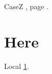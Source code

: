 \documentclass{article}
\begin{document}
CaseZ , page .

\section{Here}\label{here}
Local \ref{here}.
\end{document}
